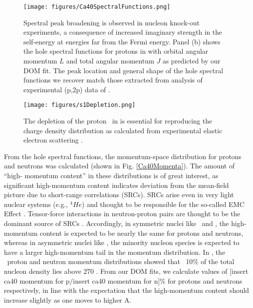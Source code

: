 \begin{figure}[tb]
    \centering
    \texttt{[image: figures/Ca40SpectralFunctions.png]}
    \caption[Spectral peak broadening in \caForty: DOM prediction and experimental (p,2p) data]
    {
        Spectral peak broadening is observed in nucleon knock-out experiments, a 
        consequence of increased imaginary strength in the self-energy at energies far from the
        Fermi energy. Panel (b) shows the hole spectral functions for protons in \caForty
        with orbital angular momentum $L$ and total angular momentum $J$ as predicted by our DOM fit.
        The peak location and general shape of the hole spectral functions we recover match those
        extracted from analysis of experimental (p,2p) data of \cite{LiverpoolCa40}.
    }
    \label{Ca40SpectralFunctions}
\end{figure}

\begin{figure}[tb]
    \centering
    \texttt{[image: figures/s1Depletion.png]}
    \caption[Depletion of proton \sOne\ in \caForty essential to reproduce charge density
    distribution]
    {
        The depletion of the proton \sOne\ in \caForty is essential
        for reproducing the charge density
        distribution as calculated from experimental elastic electron scattering \cite{DeVries1987}.
    }
    \label{s1Depletion}
\end{figure}

From the hole spectral functions, the momentum-space distribution for protons and neutrons was
calculated (shown in Fig. \ref{Ca40Momenta}). The amount of ``high-
momentum content'' in these distributions is of great interest, as significant high-momentum content 
indicates deviation from the mean-field picture due to short-range correlations (SRCs). SRCs arise 
even in very light nuclear systems (e.g., $^{4}He$)
and thought to be responsible for the so-called EMC Effect \cite{PRC_85_047301_OHen, 
PRC_86_065204_Arrington, CLAS2019}.
Tensor-force 
interactions in neutron-proton pairs are thought to be the dominant source of 
SRCs \cite{Subedi2008}. Accordingly, in symmetric nuclei like \cTwelve\ and \caForty, the
high-momentum content is expected to be nearly the same for protons and neutrons, whereas in
asymmetric nuclei like \pbEight, the minority nucleon species is expected to have a larger
high-momentum tail in the momentum distribution. In \cite{C12HighMomentum}, the \cTwelve\ proton and
neutron momentum distributions showed that ~10\% of the total nucleon density
lies above 270 \mega\electronvolt{}.
From our DOM fits, we calculate values of [insert ca40 momentum for p/insert ca40 momentum for n]\%
for protons and neutrons respectively, in line with the expectation that the high-momentum content
should increase slightly as one moves to higher A.

